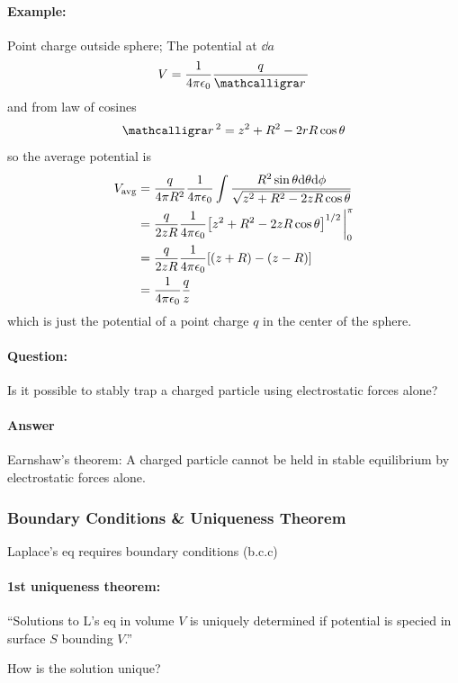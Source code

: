 \documentclass[../main.tex]{subfiles}
\begin{document}
\paragraph{Example:} Point charge outside sphere; The potential at $\dd a$
\begin{align*}
    V = \ke \frac{q}{\scriptr} 
\end{align*}
and from law of cosines 
\begin{align*}
    \scriptr^2 = z^2 + R^2 - 2rR\cos\theta
\end{align*}
so the average potential is
\begin{align*}
    V_\text{avg} &= \frac{q}{4\pi R^2} \ke \int \frac{R^2 \sin\theta \dd\theta \dd\phi}{\sqrt{z^2 + R^2 - 2zR\cos\theta}} \\
    &= \frac{q}{2zR} \ke \qt[z^2 + R^2 - 2zR\cos\theta]^{1/2} \eval_0^\pi \\
    &= \frac{q}{2zR} \ke \qt[(z + R) - (z - R)] \\
    &= \ke \frac{q}{z}
\end{align*}
which is just the potential of a point charge $q$ in the center of the sphere.

\paragraph{Question:} Is it possible to stably trap a charged particle using electrostatic forces alone? 

\paragraph{Answer} Earnshaw's theorem: A charged particle cannot be held in stable equilibrium by electrostatic forces alone.

\subsubsection{Boundary Conditions \& Uniqueness Theorem}

Laplace's eq requires boundary conditions (b.c.c)

\paragraph{1st uniqueness theorem:}

``Solutions to L's eq in volume $V$ is uniquely determined if potential is specied in surface $S$ bounding $V$.''

How is the solution unique?
\end{document}
